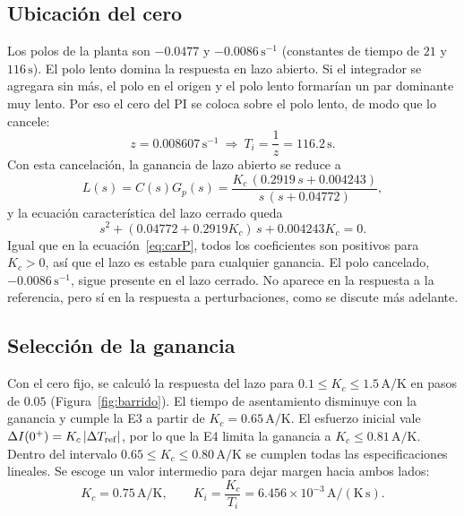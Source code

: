 \subsection{Ubicación del cero}
Los polos de la planta son $-0.0477$ y $-0.0086\,\mathrm{s^{-1}}$ (constantes de tiempo de $21$ y $116\,\mathrm s$). El polo lento domina la respuesta en lazo abierto. Si el integrador se agregara sin más, el polo en el origen y el polo lento formarían un par dominante muy lento. Por eso el cero del PI se coloca sobre el polo lento, de modo que lo cancele:
\begin{equation}
z=0.008607\,\mathrm{s^{-1}}\ \Rightarrow\ T_i=\frac{1}{z}=116.2\,\mathrm s.\label{eq:cero}
\end{equation}
Con esta cancelación, la ganancia de lazo abierto se reduce a
\begin{equation}
L(s)=C(s)G_p(s)=\frac{K_c\,(0.2919\,s+0.004243)}{s\,(s+0.04772)},\label{eq:L}
\end{equation}
y la ecuación característica del lazo cerrado queda
\begin{equation}
s^2+(0.04772+0.2919K_c)\,s+0.004243K_c=0.\label{eq:carPI}
\end{equation}
Igual que en la ecuación~\eqref{eq:carP}, todos los coeficientes son positivos para $K_c>0$, así que el lazo es estable para cualquier ganancia. El polo cancelado, $-0.0086\,\mathrm{s^{-1}}$, sigue presente en el lazo cerrado. No aparece en la respuesta a la referencia, pero sí en la respuesta a perturbaciones, como se discute más adelante.

\subsection{Selección de la ganancia}
Con el cero fijo, se calculó la respuesta del lazo para $0.1\le K_c\le1.5\,\mathrm{A/K}$ en pasos de $0.05$ (Figura~\ref{fig:barrido}). El tiempo de asentamiento disminuye con la ganancia y cumple la E3 a partir de $K_c=0.65\,\mathrm{A/K}$. El esfuerzo inicial vale $\Delta I(0^+)=K_c\,|\Delta T_{\rm ref}|$, por lo que la E4 limita la ganancia a $K_c\le0.81\,\mathrm{A/K}$. Dentro del intervalo $0.65\le K_c\le0.80\,\mathrm{A/K}$ se cumplen todas las especificaciones lineales. Se escoge un valor intermedio para dejar margen hacia ambos lados:
\begin{equation}
K_c=0.75\,\mathrm{A/K},\qquad K_i=\frac{K_c}{T_i}=6.456\times10^{-3}\,\mathrm{A/(K\,s)}.\label{eq:ganancias}
\end{equation}

